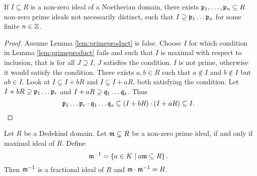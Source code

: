 \begin{lemma}
\label{lem:primeproduct}
If $ I \subseteq R $ is a non-zero ideal of a Noetherian domain, there exists $ \mathfrak{p}_1, \dots, \mathfrak{p}_n \subseteq R $ non-zero prime ideals not necessarily distinct, such that $ I \supseteq \mathfrak{p}_1 \dots \mathfrak{p}_n $ for some finite $ n \in \mathbb{Z} $.
\end{lemma}

\begin{proof}
Assume Lemma \ref{lem:primeproduct} is false. Choose $ I $ for which condition in Lemma \ref{lem:primeproduct} fails and such that $ I $ is maximal with respect to inclusion, that is for all $ J \supseteq I $, $ J $ satisfies the condition. $ I $ is not prime, otherwise it would satisfy the condition. There exists $ a, b \in R $ such that $ a \notin I $ and $ b \notin I $ but $ ab \in I $. Look at $ I \subsetneq I + bR $ and $ I \subsetneq I + aR $, both satisfying the condition. Let $ I + bR \supseteq \mathfrak{p}_1 \dots \mathfrak{p}_r $ and $ I + aR \supseteq \mathfrak{q}_1 \dots \mathfrak{q}_s $.
Thus
$$ \mathfrak{p}_1 \dots \mathfrak{p}_r \cdot \mathfrak{q}_1 \dots \mathfrak{q}_s \subseteq \left( I + bR \right) \cdot \left( I + aR \right) \subseteq I. $$
\end{proof}

\begin{proposition}
\label{prop:inverse}
Let $ R $ be a Dedekind domain. Let $ \mathfrak{m} \subsetneq R $ be a non-zero prime ideal, if and only if maximal ideal of $ R $. Define
$$ \mathfrak{m}^{-1} = \left\{ a \in K \mid a\mathfrak{m} \subseteq R \right\}. $$
Then $ \mathfrak{m}^{-1} $ is a fractional ideal of $ R $ and $ \mathfrak{m} \cdot \mathfrak{m}^{-1} = R $.
\end{proposition}


